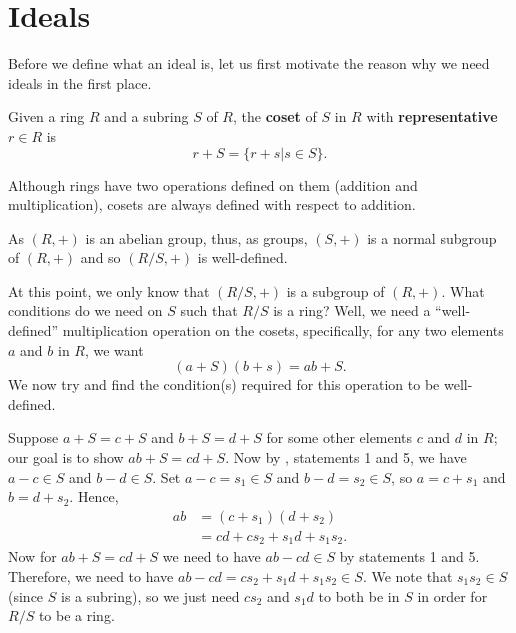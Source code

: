 \section{Ideals}
Before we define what an ideal is, let us first motivate the reason why we need ideals in the first place.
\begin{definition}
    Given a ring $R$ and a subring $S$ of $R$, the \textbf{coset} of $S$ in $R$ with \textbf{representative} $r \in R$ is
    \[
        r + S = \{r+s \vert s \in S\}.
    \]
\end{definition}
\begin{remark}
    Although rings have two operations defined on them (addition and multiplication), cosets are always defined with respect to addition.
\end{remark}
\begin{remark}
    As $(R,+)$ is an abelian group, thus, as groups, $(S,+)$ is a normal subgroup of $(R,+)$ and so $(R/S,+)$ is well-defined.
\end{remark}

At this point, we only know that $(R/S,+)$ is a subgroup of $(R,+)$. What conditions do we need on $S$ such that $R/S$ is a ring? Well, we need a ``well-defined'' multiplication operation on the cosets, specifically, for any two elements $a$ and $b$ in $R$, we want
\[
    (a+S)(b+s) = ab + S.
\]
We now try and find the condition(s) required for this operation to be well-defined.

Suppose $a+S = c+S$ and $b+S = d+S$ for some other elements $c$ and $d$ in $R$; our goal is to show $ab+S = cd+S$. Now by , statements 1 and 5, we have $a-c \in S$ and $b-d \in S$. Set $a-c = s_1 \in S$ and $b-d = s_2 \in S$, so $a = c+s_1$ and $b = d+s_2$. Hence,
\begin{align*}
    ab &= (c+s_1)(d+s_2)\\
    &= cd + cs_2 + s_1d + s_1s_2.
\end{align*}
Now for $ab + S = cd+S$ we need to have $ab-cd \in S$ by  statements 1 and 5. Therefore, we need to have $ab-cd = cs_2+s_1d+s_1s_2 \in S$. We note that $s_1s_2 \in S$ (since $S$ is a subring), so we just need $cs_2$ and $s_1d$ to both be in $S$ in order for $R/S$ to be a ring.

